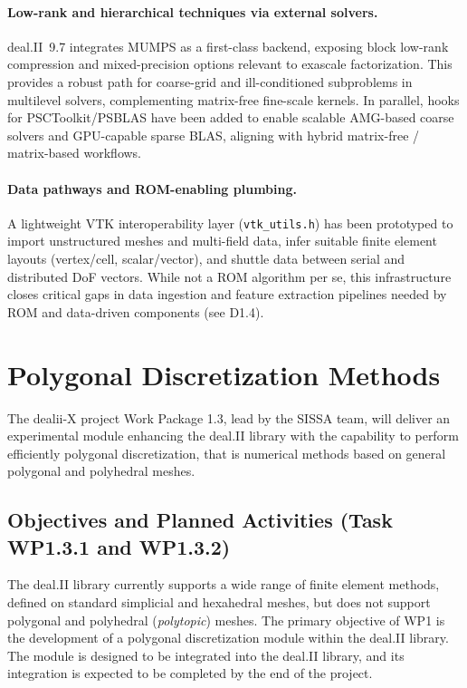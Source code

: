 \documentclass[a4paper,12pt]{article}
\begin{document}
\paragraph{Low-rank and hierarchical techniques via external solvers.}
deal.II~9.7 integrates MUMPS as a first-class backend, exposing block low-rank
compression and mixed-precision options relevant to exascale factorization.
This provides a robust path for coarse-grid and ill-conditioned subproblems in
multilevel solvers, complementing matrix-free fine-scale kernels. In parallel,
hooks for PSCToolkit/PSBLAS have been added to enable scalable AMG-based
coarse solvers and GPU-capable sparse BLAS, aligning with hybrid matrix-free /
matrix-based workflows.

\paragraph{Data pathways and ROM-enabling plumbing.}
A lightweight VTK interoperability layer (\texttt{vtk\_utils.h}) has been
prototyped to import unstructured meshes and multi-field data, infer suitable
finite element layouts (vertex/cell, scalar/vector), and shuttle data between
serial and distributed DoF vectors. While not a ROM algorithm per se, this
infrastructure closes critical gaps in data ingestion and feature extraction
pipelines needed by ROM and data-driven components (see D1.4).

\section{Polygonal Discretization Methods}

 The dealii-X project Work Package 1.3, lead by the SISSA team, will deliver an experimental module enhancing the
deal.II library with the capability to perform efficiently polygonal discretization, that is numerical methods based on general polygonal and polyhedral meshes.%

\subsection{Objectives and Planned Activities (Task WP1.3.1 and WP1.3.2)}

The deal.II library currently
supports a wide range of finite element methods, defined on standard simplicial
and hexahedral meshes, but does not support polygonal and polyhedral (\emph{polytopic}) meshes.
The primary objective of WP1 is the development of a polygonal
discretization module within the deal.II library. The module is designed to be integrated into the deal.II library, and its integration is expected to be completed by the end of the project.
\end{document}
